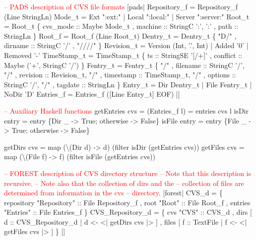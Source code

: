 \begin{code}
\textcolor{red}{-- PADS description of CVS file formats}
[pads|  Repository_f = Repository_f (Line StringLn)
\mbox{}
        Mode_t = Ext ":ext:" | Local ":local:" | Server ":server:" 
\mbox{}
        Root_t = Root_t
            \{ cvs_mode :: Maybe Mode_t
            , machine  :: StringC ':', ':'
            , path     :: StringLn            
            \}                                  
\mbox{}
        Root_f = Root_f (Line Root_t)
\mbox{}
        Dentry_t = Dentry_t
            \{ "D/"
            , dirname :: StringC '/'
            , "////"
            \}
\mbox{}
        Revision_t  = Version (Int, '.', Int) | Added '0' | Removed '-'
\mbox{}
        TimeStamp_t = TimeStamp_t
             \{ ts       :: StringSE '[/+]'
             , conflict :: Maybe ('+', StringC '/') \}
\mbox{}
        Fentry_t = Fentry_t \{                         "/"  
                       , filename   :: StringC '/',       "/"
                       , revision   :: Revision_t,        "/"
                       , timestamp  :: TimeStamp_t,       "/"   
                       , options    :: StringC '/',       "/"  
                       , tagdate    :: StringLn
                       \}
\mbox{}
        Entry_t   = Dir Dentry_t | File Fentry_t | NoDir 'D'
\mbox{}
        Entries_f = Entries_f ([Line Entry_t]  EOF)
|]
\end{code}
\begin{code}

\textcolor{red}{-- Auxiliary Haskell functions}
getEntries cvs =  (Entries_f l) = entries cvs  l
\mbox{}             
isDir entry  =  entry  \{Dir _  -> True; otherwise -> False\}
isFile entry =  entry  \{File _ -> True; otherwise -> False\}
\mbox{}                            

getDirs  cvs = map (\textbackslash(Dir d)  -> d) (filter isDir  (getEntries cvs))
getFiles cvs = map (\textbackslash(File f) -> f) (filter isFile (getEntries cvs))
\end{code}
\begin{code}

\textcolor{red}{-- FOREST description of CVS directory structure}
\textcolor{red}{-- Note that this description is recursive.}
\textcolor{red}{-- Note also that the collection of dirs and the 
-- collection of files are determined from information in the cvs 
-- directory.}
[forest|  CVS_d = 
              \{ repository  "Repository" :: File Repository_f
              , root        "Root"       :: File Root_f
              , entries     "Entries"    :: File Entries_f
              \}
\mbox{}             
          CVS_Repository_d = 
             \{ cvs          "CVS"                 :: CVS_d
             , dirs         [ d  :: CVS_Repository_d | d <- <| getDirs  cvs |> ]
             , files        [ f  :: TextFile         | f <- <| getFiles cvs |> ]
             \} |]

\end{code}
